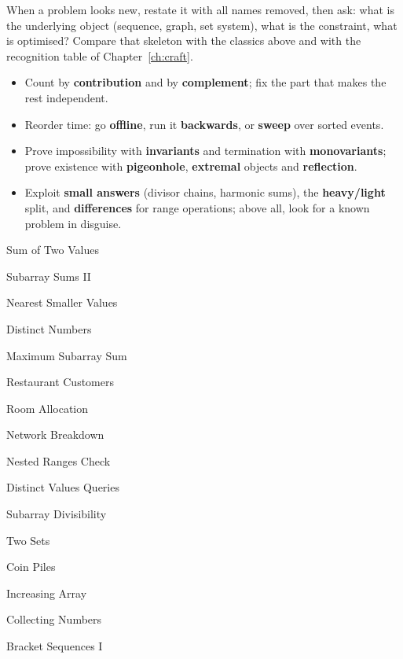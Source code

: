 \begin{tip}
When a problem looks new, restate it with all names removed, then ask: what is the underlying object (sequence, graph,
set system), what is the constraint, what is optimised? Compare that skeleton with the classics above and with the
recognition table of Chapter~\ref{ch:craft}.
\end{tip}

\begin{summary}
\begin{itemize}
  \item Count by \textbf{contribution} and by \textbf{complement}; fix the part that makes the rest independent.
  \item Reorder time: go \textbf{offline}, run it \textbf{backwards}, or \textbf{sweep} over sorted events.
  \item Prove impossibility with \textbf{invariants} and termination with \textbf{monovariants}; prove existence with
        \textbf{pigeonhole}, \textbf{extremal} objects and \textbf{reflection}.
  \item Exploit \textbf{small answers} (divisor chains, harmonic sums), the \textbf{heavy/light} split, and
        \textbf{differences} for range operations; above all, look for a known problem in disguise.
\end{itemize}
\end{summary}

\begin{practice}
\begin{pplist}
  \item Sum of Two Values
  \item Subarray Sums II
  \item Nearest Smaller Values
  \item Distinct Numbers
  \item Maximum Subarray Sum
\end{pplist}
\begin{pplist}
  \item Restaurant Customers
  \item Room Allocation
  \item Network Breakdown
  \item Nested Ranges Check
  \item Distinct Values Queries
\end{pplist}
\begin{pplist}
  \item Subarray Divisibility
  \item Two Sets
  \item Coin Piles
  \item Increasing Array
  \item Collecting Numbers
  \item Bracket Sequences I
\end{pplist}
\end{practice}
